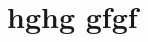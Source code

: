 \documentclass[conference]{../../setup/IEEEtran}
\title[Social privacy score throhghugh vulnerability contagion process]
\author[Aghiles DJOUDI, Guy PUJOLLE\\ \textsf{Sorbonne University} \\ \textsf{4 Place Jussieu, 75005 Paris, France} \\ \textsf{firstname.lastname@upmc.fr}]
\let\oldsection\section
\renewcommand{\section}[1][]{%
\oldsection{#1}
}
\begin{document}
\maketitle





\section[hghg gfgf]


%
%
%
%
%
%

\printbibliography
\end{document}
